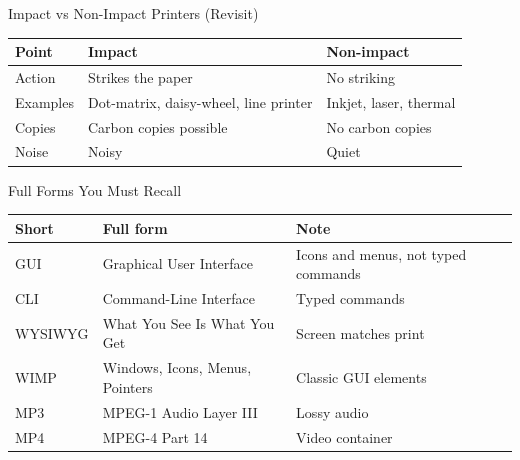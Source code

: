 \documentclass[aspectratio=169]{beamer}
\begin{document}
\begin{frame}{Impact vs Non-Impact Printers (Revisit)}
  \begin{center}
    \begin{tabular}{p{}p{}p{}}
      \toprule
      \textbf{Point} & \textbf{Impact} & \textbf{Non-impact} \\
      \midrule
      Action & Strikes the paper & No striking \\
      Examples & Dot-matrix, daisy-wheel, line printer & Inkjet, laser, thermal \\
      Copies & Carbon copies possible & No carbon copies \\
      Noise & Noisy & Quiet \\
      \bottomrule
    \end{tabular}
  \end{center}
  \vspace{0.2cm}
\end{frame}

\begin{frame}{Full Forms You Must Recall}
  \begin{center}
    \begin{tabular}{p{}p{}p{}}
      \toprule
      \textbf{Short} & \textbf{Full form} & \textbf{Note} \\
      \midrule
      GUI & Graphical User Interface & Icons and menus, not typed commands \\
      CLI & Command-Line Interface & Typed commands \\
      WYSIWYG & What You See Is What You Get & Screen matches print \\
      WIMP & Windows, Icons, Menus, Pointers & Classic GUI elements \\
      MP3 & MPEG-1 Audio Layer III & Lossy audio \\
      MP4 & MPEG-4 Part 14 & Video container \\
      \bottomrule
    \end{tabular}
  \end{center}
\end{frame}
\end{document}
